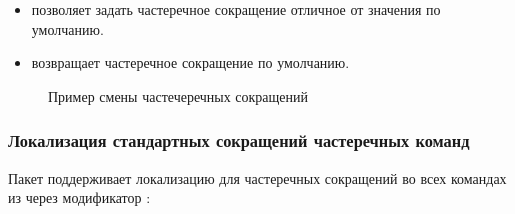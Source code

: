 \begin{itemize}
    \item \manModifier[rsSetAcr] позволяет задать частеречное сокращение отличное от значения по умолчанию.
          \ExplSyntaxOn
          \begin{signature}
              \manModifier[cmd] \manColon{}
              \manOpt{ \manArg[язык:tl] }
              \manReq{ \manArg[сокращение:tl]  }
          \end{signature}
          \ExplSyntaxOff
    \item \manModifier[rsResetAcr] возвращает частеречное сокращение по умолчанию.
          \ExplSyntaxOn
          \begin{signature}
              \manModifier[cmd] \manColon{}
              \manOpt{ \manArg[язык:tl] }
          \end{signature}
          \ExplSyntaxOff
\end{itemize}


\begin{figure}[H]
    \centering
    \begin{minipage}[c]{0.5\textwidth}
        \begin{Latexcode}
        \end{Latexcode}
    \end{minipage}
    \hfill
    \begin{minipage}[c]{0.4\textwidth}
        \small
    \end{minipage}

    \caption{Пример смены частечеречных сокращений}
\end{figure}


\subsubsection{Локализация стандартных сокращений частеречных команд}

Пакет  поддерживает локализацию для частеречных сокращений во всех командах из
 через модификатор \manModifier[rsSetLanguage]:
\ExplSyntaxOn
\begin{signature}
\end{signature}
\ExplSyntaxOff


